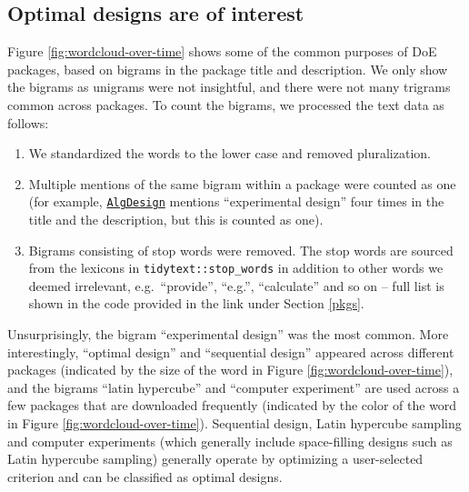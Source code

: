 \documentclass{article}
\providecommand{\tightlist}{%
  \setlength{\itemsep}{0pt}\setlength{\parskip}{0pt}}
\def\tightlist{}
\begin{document}
\hypertarget{optimal-designs-are-of-interest}{%
\subsection{Optimal designs are of
interest}\label{optimal-designs-are-of-interest}}

Figure \ref{fig:wordcloud-over-time} shows some of the common purposes
of DoE packages, based on bigrams in the package title and description.
We only show the bigrams as unigrams were not insightful, and there were
not many trigrams common across packages. To count the bigrams, we
processed the text data as follows:

\begin{enumerate}
\def\labelenumi{\arabic{enumi}.}
\tightlist
\item
  We standardized the words to the lower case and removed pluralization.
\item
  Multiple mentions of the same bigram within a package were counted as
  one (for example,
  \href{https://cran.r-project.org/web/packages/AlgDesign/index.html}{\texttt{AlgDesign}}
  mentions ``experimental design'' four times in the title and the
  description, but this is counted as one).
\item
  Bigrams consisting of stop words were removed. The stop words are
  sourced from the lexicons in \texttt{tidytext::stop\_words} in
  addition to other words we deemed irrelevant, e.g.~``provide'',
  ``e.g.'', ``calculate'' and so on -- full list is shown in the code
  provided in the link under Section \ref{pkgs}.
\end{enumerate}

Unsurprisingly, the bigram ``experimental design'' was the most common.
More interestingly, ``optimal design'' and ``sequential design''
appeared across different packages (indicated by the size of the word in
Figure \ref{fig:wordcloud-over-time}), and the bigrams ``latin
hypercube'' and ``computer experiment'' are used across a few packages
that are downloaded frequently (indicated by the color of the word in
Figure \ref{fig:wordcloud-over-time}). Sequential design, Latin
hypercube sampling and computer experiments (which generally include
space-filling designs such as Latin hypercube sampling) generally
operate by optimizing a user-selected criterion and can be classified as
optimal designs.
\end{document}
